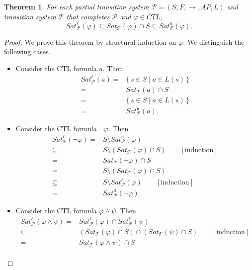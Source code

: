 \documentclass[12pt]{article}
\newtheorem{theorem}{Theorem}
\theoremstyle{definition}
\newcommand{\comment}[1]{\hspace{2em}[\mbox{#1}]}
\begin{document}
\begin{theorem}
\label{theorem:bounds}
For each partial transition system $\mathcal{P} = (S, F, \rightarrow, \mathit{AP}, L)$ and transition system $\mathcal{T}$ that completes $\mathcal{P}$ and $\varphi \in \mathit{CTL}$,
\[
\mathit{Sat}^{\ell}_{\mathcal{P}}(\varphi)
\subseteq \mathit{Sat}_{\mathcal{T}}(\varphi) \cap S
\subseteq \mathit{Sat}^u_{\mathcal{P}}(\varphi).
\]
\end{theorem}
\begin{proof}
We prove this theorem by structural induction on $\varphi$.  We distinguish the following cases.
\begin{itemize}
\item 
Consider the CTL formula $a$.  Then
\begin{align*}
\mathit{Sat}^{\ell}_{\mathcal{P}}(a)
= & \{\, s \in S \mid a \in L(s) \,\}\\
= & \mathit{Sat}_{\mathcal{T}}(a) \cap S\\
= & \{\, s \in S \mid a \in L(s) \,\}\\
= & \mathit{Sat}^u_{\mathcal{P}}(a).
\end{align*}
\item
Consider the CTL formula $\neg \varphi$.  Then
\begin{align*}
\mathit{Sat}^{\ell}_{\mathcal{P}}(\neg \varphi)
= & S \setminus \mathit{Sat}^u_{\mathcal{P}}(\varphi)\\
\subseteq & S \setminus (\mathit{Sat}_{\mathcal{T}}(\varphi) \cap S)
\comment{induction}\\
= & \mathit{Sat}_{\mathcal{T}}(\neg \varphi) \cap S\\
= & S \setminus (\mathit{Sat}_{\mathcal{T}}(\varphi) \cap S)\\
\subseteq & S \setminus \mathit{Sat}^{\ell}_{\mathcal{P}}(\varphi)
\comment{induction}\\
= & \mathit{Sat}^u_{\mathcal{P}}(\neg \varphi).
\end{align*}
\item
Consider the CTL formula $\varphi \wedge \psi$.  Then
\begin{align*}
\mathit{Sat}^{\ell}_{\mathcal{P}}(\varphi \wedge \psi)
= & \mathit{Sat}^{\ell}_{\mathcal{P}}(\varphi) \cap \mathit{Sat}^{\ell}_{\mathcal{P}}(\psi)\\
\subseteq & (\mathit{Sat}_{\mathcal{T}}(\varphi) \cap S) \cap (\mathit{Sat}_{\mathcal{T}}(\psi) \cap S)
\comment{induction}\\
= & \mathit{Sat}_{\mathcal{T}}(\varphi \wedge \psi) \cap S\\

\end{align*}
\end{itemize}
\end{proof}
\end{document}
